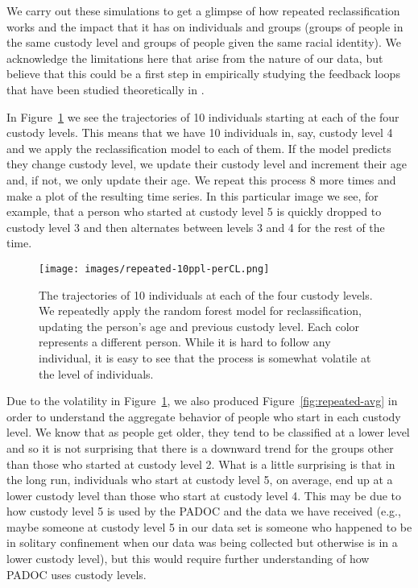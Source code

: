 \documentclass{amsproc}
\numberwithin{equation}{section}
\theoremstyle{plain}
\theoremstyle{remark}
\begin{document}
We carry out these simulations to get a glimpse of how repeated reclassification works and the impact that it has on individuals and groups (groups of people in the same custody level and groups of people given the same racial identity).  We acknowledge the limitations here that arise from the nature of our data, but believe that this could be a first step in empirically studying the feedback loops that have been studied theoretically in \cite{ensign}.

In Figure~\ref{fig:repeated-10ppl} we see the trajectories of 10 individuals starting at each of the four custody levels.  This means that we have 10 individuals in, say, custody level 4 and we apply the reclassification model to each of them.  If the model predicts they change custody level, we update their custody level and increment their age and, if not, we only update their age.  We repeat this process 8 more times and make a plot of the resulting time series.  In this particular image we see, for example, that a person who started at custody level 5 is quickly dropped to custody level 3 and then alternates between levels 3 and 4 for the rest of the time.  




\begin{figure}
\centering
\texttt{[image: images/repeated-10ppl-perCL.png]}
\caption{The trajectories of 10 individuals at each of the four custody levels.  We repeatedly apply the random forest model for reclassification, updating the person's age and previous custody level.  Each color represents a different person.  While it is hard to follow any individual, it is easy to see that the process is somewhat volatile at the level of individuals.}\label{fig:repeated-10ppl}
\end{figure}


Due to the volatility in Figure~\ref{fig:repeated-10ppl}, we also produced Figure~\ref{fig:repeated-avg} in order to understand the aggregate behavior of people who start in each custody level.  We know that as people get older, they tend to be classified at a lower level and so it is not surprising that there is a downward trend for the groups other than those who started at custody level 2.  What is a little surprising is that in the long run, individuals who start at custody level 5, on average, end up at a lower custody level than those who start at custody level 4.  This may be due to how custody level 5 is used by the PADOC and the data we have received (e.g., maybe someone at custody level 5 in our data set is someone who happened to be in solitary confinement when our data was being collected but otherwise is in a lower custody level), but this would require further understanding of how PADOC uses custody levels.
\end{document}
